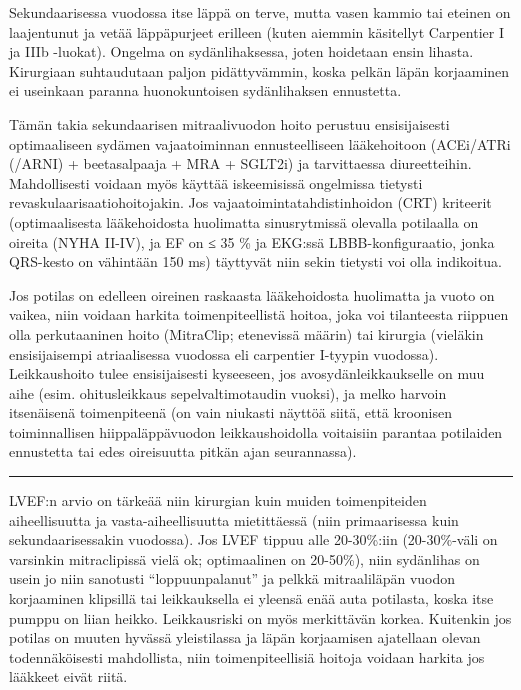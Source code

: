 \documentclass[
]{book}
\begin{document}
Sekundaarisessa vuodossa itse läppä on terve, mutta vasen kammio tai eteinen on laajentunut ja vetää läppäpurjeet erilleen (kuten aiemmin käsitellyt Carpentier I ja IIIb -luokat). Ongelma on sydänlihaksessa, joten hoidetaan ensin lihasta. Kirurgiaan suhtaudutaan paljon pidättyvämmin, koska pelkän läpän korjaaminen ei useinkaan paranna huonokuntoisen sydänlihaksen ennustetta.

Tämän takia sekundaarisen mitraalivuodon hoito perustuu ensisijaisesti optimaaliseen sydämen vajaatoiminnan ennusteelliseen lääkehoitoon (ACEi/ATRi (/ARNI) + beetasalpaaja + MRA + SGLT2i) ja tarvittaessa diureetteihin. Mahdollisesti voidaan myös käyttää iskeemisissä ongelmissa tietysti revaskulaarisaatiohoitojakin. Jos vajaatoimintatahdistinhoidon (CRT) kriteerit (optimaalisesta lääkehoidosta huolimatta sinusrytmissä olevalla potilaalla on oireita (NYHA II-IV), ja EF on ≤ 35 \% ja EKG:ssä LBBB-konfiguraatio, jonka QRS-kesto on vähintään 150 ms) täyttyvät niin sekin tietysti voi olla indikoitua.

Jos potilas on edelleen oireinen raskaasta lääkehoidosta huolimatta ja vuoto on vaikea, niin voidaan harkita toimenpiteellistä hoitoa, joka voi tilanteesta riippuen olla perkutaaninen hoito (MitraClip; etenevissä määrin) tai kirurgia (vieläkin ensisijaisempi atriaalisessa vuodossa eli carpentier I-tyypin vuodossa). Leikkaushoito tulee ensisijaisesti kyseeseen, jos avosydänleikkaukselle on muu aihe (esim. ohitusleikkaus sepelvaltimotaudin vuoksi), ja melko harvoin itsenäisenä toimenpiteenä (on vain niukasti näyttöä siitä, että kroonisen toiminnallisen hiippaläppävuodon leikkaushoidolla voitaisiin parantaa potilaiden ennustetta tai edes oireisuutta pitkän ajan seurannassa).

\begin{center}\rule{0.5\linewidth}{0.5pt}\end{center}

LVEF:n arvio on tärkeää niin kirurgian kuin muiden toimenpiteiden aiheellisuutta ja vasta-aiheellisuutta mietittäessä (niin primaarisessa kuin sekundaarisessakin vuodossa). Jos LVEF tippuu alle 20-30\%:iin (20-30\%-väli on varsinkin mitraclipissä vielä ok; optimaalinen on 20-50\%), niin sydänlihas on usein jo niin sanotusti ``loppuunpalanut'' ja pelkkä mitraaliläpän vuodon korjaaminen klipsillä tai leikkauksella ei yleensä enää auta potilasta, koska itse pumppu on liian heikko. Leikkausriski on myös merkittävän korkea. Kuitenkin jos potilas on muuten hyvässä yleistilassa ja läpän korjaamisen ajatellaan olevan todennäköisesti mahdollista, niin toimenpiteellisiä hoitoja voidaan harkita jos lääkkeet eivät riitä.
\end{document}
